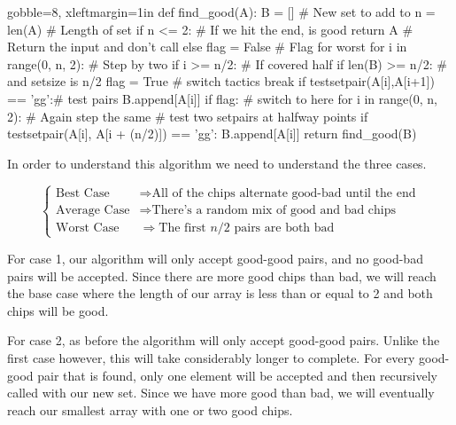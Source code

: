 \documentclass[10pt]{article}
\begin{document}
\begin{easylist}[enumerate]
    \begin{pythoncode*}{gobble=8, xleftmargin=1in}
        def find_good(A):
            B = []       # New set to add to
            n = len(A)   # Length of set
            if n <= 2:   # If we hit the end, is good
                return A # Return the input and don't call
            else
                flag = False              # Flag for worst
                for i in range(0, n, 2):  # Step by two
                    if i >= n/2:          # If covered half
                        if len(B) >= n/2: # and setsize is n/2
                            flag = True   # switch tactics
                            break
                    if testsetpair(A[i],A[i+1]) == 'gg':# test pairs
                        B.append[A[i]]
                if flag:                  # switch to here
                    for i in range(0, n, 2): # Again step the same
                        # test two setpairs at halfway points
                        if testsetpair(A[i], A[i + (n/2)]) == 'gg':
                            B.append[A[i]]
                return find_good(B)
    \end{pythoncode*}

    In order to understand this algorithm we need to understand the three cases.

    \[ \begin{cases}
            \text{Best Case} &\Rightarrow \text{All of the chips alternate good-bad until the end}\\
            \text{Average Case} &\Rightarrow \text{There's a random mix of good and bad chips}\\
            \text{Worst Case} &\Rightarrow \text{The first $n/2$ pairs are both bad}
    \end{cases} \]

    For case 1, our algorithm will only accept good-good pairs, and no good-bad pairs will be accepted. Since there are more good chips than bad, we will reach the base case where the length of our array is less than or equal to 2 and both chips will be good.\newline

    For case 2, as before the algorithm will only accept good-good pairs. Unlike the first case however, this will take considerably longer to complete. For every good-good pair that is found, only one element will be accepted and then recursively called with our new set. Since we have more good than bad, we will eventually reach our smallest array with one or two good chips.\newline


\end{easylist}
\end{document}
